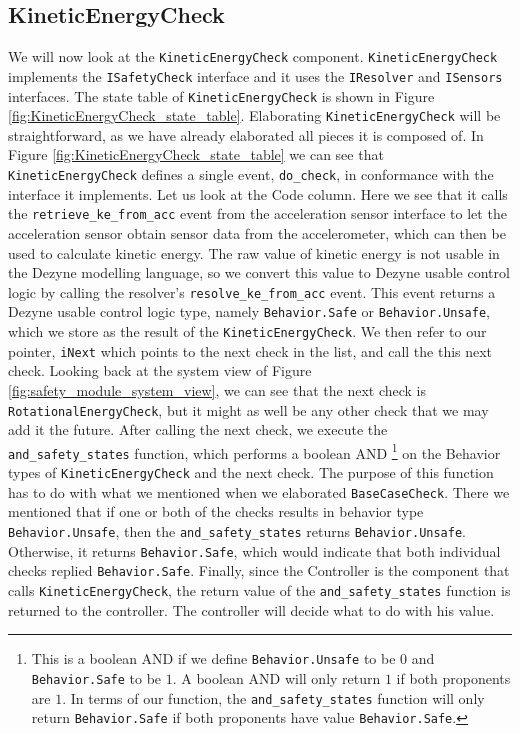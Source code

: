 \documentclass[12pt]{scrreprt}
\begin{document}
\begin{appendices}
\subsection{KineticEnergyCheck}
We will now look at the \texttt{KineticEnergyCheck} component. \texttt{KineticEnergyCheck} implements the \texttt{ISafetyCheck} interface and it uses the \texttt{IResolver} and \texttt{ISensors} interfaces. The state table of \texttt{KineticEnergyCheck} is shown in Figure \ref{fig:KineticEnergyCheck_state_table}. Elaborating \texttt{KineticEnergyCheck} will be straightforward, as we have already elaborated all pieces it is composed of. In Figure \ref{fig:KineticEnergyCheck_state_table} we can see that \texttt{KineticEnergyCheck} defines a single event, \texttt{do\_check}, in conformance with the interface it implements. Let us look at the Code column. Here we see that it calls the \texttt{retrieve\_ke\_from\_acc} event from the acceleration sensor interface to let the acceleration sensor obtain sensor data from the accelerometer, which can then be used to calculate kinetic energy. The raw value of kinetic energy is not usable in the Dezyne modelling language, so we convert this value to Dezyne usable control logic by calling the resolver's \texttt{resolve\_ke\_from\_acc} event. This event returns a Dezyne usable control logic type, namely \texttt{Behavior.Safe} or \texttt{Behavior.Unsafe}, which we store as the result of the \texttt{KineticEnergyCheck}. We then refer to our pointer, \texttt{iNext} which points to the next check in the list, and call the this next check. Looking back at the system view of Figure \ref{fig:safety_module_system_view}, we can see that the next check is \texttt{RotationalEnergyCheck}, but it might as well be any other check that we may add it the future. After calling the next check, we execute the \texttt{and\_safety\_states}  function, which performs a boolean AND \footnote{This is a boolean AND if we define \texttt{Behavior.Unsafe} to be $0$ and \texttt{Behavior.Safe} to be $1$. A boolean AND will only return $1$ if both proponents are $1$. In terms of our function, the \texttt{and\_safety\_states} function will only return \texttt{Behavior.Safe} if both proponents have value \texttt{Behavior.Safe}.} on the Behavior types of \texttt{KineticEnergyCheck} and the next check. The purpose of this function has to do with what we mentioned when we elaborated \texttt{BaseCaseCheck}. There we mentioned that if one or both of the checks results in behavior type \texttt{Behavior.Unsafe}, then the \texttt{and\_safety\_states} returns \texttt{Behavior.Unsafe}. Otherwise, it returns \texttt{Behavior.Safe}, which would indicate that both individual checks replied \texttt{Behavior.Safe}. Finally, since the Controller is the component that calls \texttt{KineticEnergyCheck}, the return value of the \texttt{and\_safety\_states} function is returned to the controller. The controller will decide what to do with his value.


\end{appendices}
\end{document}

